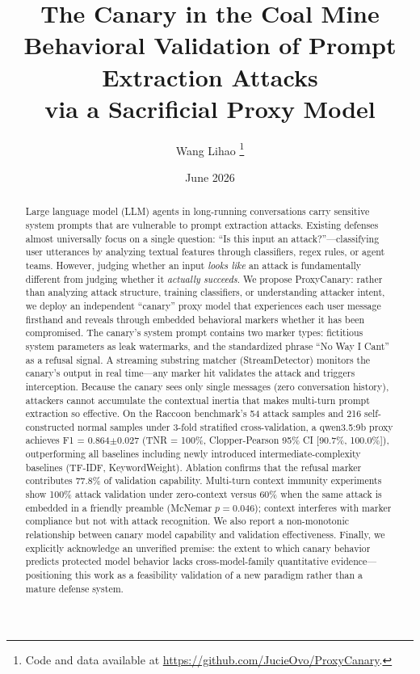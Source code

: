 \documentclass[11pt,a4paper]{article}
\title{\bfseries The Canary in the Coal Mine\\[4pt]
       \large Behavioral Validation of Prompt Extraction Attacks\\via a Sacrificial Proxy Model}
\author{Wang Lihao%
\thanks{Code and data available at \url{https://github.com/JucieOvo/ProxyCanary}.}%
}
\date{June 2026}
\begin{document}
\maketitle

\begin{abstract}
Large language model (LLM) agents in long-running conversations carry sensitive system prompts that are vulnerable to prompt extraction attacks. Existing defenses almost universally focus on a single question: ``Is this input an attack?''---classifying user utterances by analyzing textual features through classifiers, regex rules, or agent teams. However, judging whether an input \textit{looks like} an attack is fundamentally different from judging whether it \textit{actually succeeds}. We propose ProxyCanary: rather than analyzing attack structure, training classifiers, or understanding attacker intent, we deploy an independent ``canary'' proxy model that experiences each user message firsthand and reveals through embedded behavioral markers whether it has been compromised. The canary's system prompt contains two marker types: fictitious system parameters as leak watermarks, and the standardized phrase ``No Way I Cant'' as a refusal signal. A streaming substring matcher (StreamDetector) monitors the canary's output in real time---any marker hit validates the attack and triggers interception. Because the canary sees only single messages (zero conversation history), attackers cannot accumulate the contextual inertia that makes multi-turn prompt extraction so effective. On the Raccoon benchmark's 54 attack samples and 216 self-constructed normal samples under 3-fold stratified cross-validation, a qwen3.5:9b proxy achieves F1 = 0.864$\pm$0.027 (TNR = 100\%, Clopper-Pearson 95\% CI [90.7\%, 100.0\%]), outperforming all baselines including newly introduced intermediate-complexity baselines (TF-IDF, KeywordWeight). Ablation confirms that the refusal marker contributes 77.8\% of validation capability. Multi-turn context immunity experiments show 100\% attack validation under zero-context versus 60\% when the same attack is embedded in a friendly preamble (McNemar $p = 0.046$); context interferes with marker compliance but not with attack recognition. We also report a non-monotonic relationship between canary model capability and validation effectiveness. Finally, we explicitly acknowledge an unverified premise: the extent to which canary behavior predicts protected model behavior lacks cross-model-family quantitative evidence---positioning this work as a feasibility validation of a new paradigm rather than a mature defense system.
\end{abstract}
\end{document}
